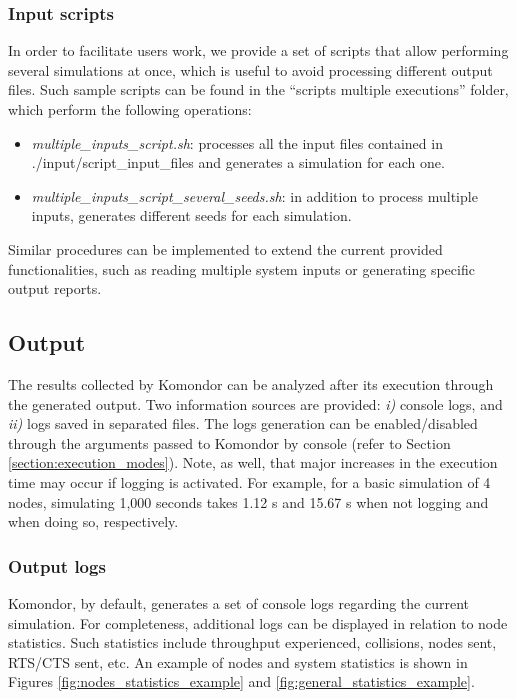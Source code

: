 \documentclass[a4paper]{article}
\begin{document}
\subsubsection{Input scripts}
\label{section:input_scripts}	
In order to facilitate users work, we provide a set of scripts that allow performing several simulations at once, which is useful to avoid processing different output files. Such sample scripts can be found in the ``scripts multiple executions'' folder, which perform the following operations:
\begin{itemize}
	\item \emph{multiple\_inputs\_script.sh}: processes all the input files contained in ./input/script\_input\_files and generates a simulation for each one. 
	\item \emph{multiple\_inputs\_script\_several\_seeds.sh}: in addition to process multiple inputs, generates different seeds for each simulation.
\end{itemize}

Similar procedures can be implemented to extend the current provided functionalities, such as reading multiple system inputs or generating specific output reports.

\subsection{Output}
\label{section:output}
The results collected by Komondor can be analyzed after its execution through the generated output. Two information sources are provided: \emph{i)} console logs, and \emph{ii)} logs saved in separated files. The logs generation can be enabled/disabled through the arguments passed to Komondor by console (refer to Section \ref{section:execution_modes}). Note, as well, that major increases in the execution time may occur if logging is activated. For example, for a basic simulation of 4 nodes, simulating 1,000 seconds takes 1.12 s and 15.67 s when not logging and when doing so, respectively.

\subsubsection{Output logs}
\label{section:output_logs}

Komondor, by default, generates a set of console logs regarding the current simulation. For completeness, additional logs can be displayed in relation to node statistics. Such statistics include throughput experienced, collisions, nodes sent, RTS/CTS sent, etc. An example of nodes and system statistics is shown in Figures \ref{fig:nodes_statistics_example} and \ref{fig:general_statistics_example}.
\end{document}
